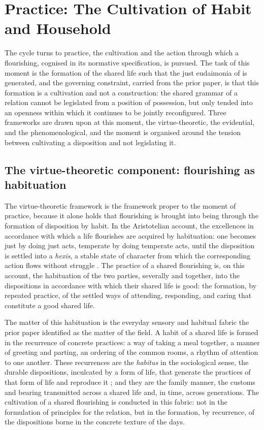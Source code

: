 \section{Practice: The Cultivation of Habit and Household}
\label{p11:sec:practice}

\noindent
The cycle turns to practice, the cultivation and the action through which a flourishing, cognised in its normative specification, is pursued. The task of this moment is the formation of the shared life such that the just eudaimonia of  is generated, and the governing constraint, carried from the prior paper, is that this formation is a cultivation and not a construction: the shared grammar of a relation cannot be legislated from a position of possession, but only tended into an openness within which it continues to be jointly reconfigured. Three frameworks are drawn upon at this moment, the virtue-theoretic, the evidential, and the phenomenological, and the moment is organised around the tension between cultivating a disposition and not legislating it.

\subsection{The virtue-theoretic component: flourishing as habituation}
\label{p11:sec:prac-virtue}

The virtue-theoretic framework is the framework proper to the moment of practice, because it alone holds that flourishing is brought into being through the formation of disposition by habit. In the Aristotelian account, the excellences in accordance with which a life flourishes are acquired by habituation: one becomes just by doing just acts, temperate by doing temperate acts, until the disposition is settled into a \emph{hexis}, a stable state of character from which the corresponding action flows without struggle \parencite{aristotle2009}. The practice of a shared flourishing is, on this account, the habituation of the two parties, severally and together, into the dispositions in accordance with which their shared life is good: the formation, by repeated practice, of the settled ways of attending, responding, and caring that constitute a good shared life.

The matter of this habituation is the everyday sensory and habitual fabric the prior paper identified as the matter of the field. A habit of a shared life is formed in the recurrence of concrete practices: a way of taking a meal together, a manner of greeting and parting, an ordering of the common rooms, a rhythm of attention to one another. These recurrences are the \emph{habitus} in the sociological sense, the durable dispositions, inculcated by a form of life, that generate the practices of that form of life and reproduce it \parencite{bourdieu1990}; and they are the family manner, the customs and bearing transmitted across a shared life and, in time, across generations. The cultivation of a shared flourishing is conducted in this fabric: not in the formulation of principles for the relation, but in the formation, by recurrence, of the dispositions borne in the concrete texture of the days.

